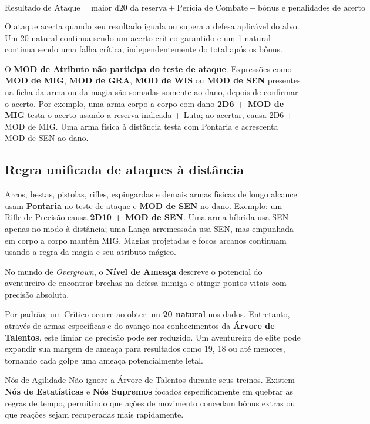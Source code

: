 \[\text{Resultado de Ataque}=\text{maior d20 da reserva}+\text{Perícia de Combate}+\text{bônus e penalidades de acerto}\]

O ataque acerta quando seu resultado iguala ou supera a defesa aplicável do alvo. Um 20 natural continua sendo um acerto crítico garantido e um 1 natural continua sendo uma falha crítica, independentemente do total após os bônus.

O \textbf{MOD de Atributo não participa do teste de ataque}. Expressões como \textbf{MOD de MIG}, \textbf{MOD de GRA}, \textbf{MOD de WIS} ou \textbf{MOD de SEN} presentes na ficha da arma ou da magia são somadas somente ao dano, depois de confirmar o acerto. Por exemplo, uma arma corpo a corpo com dano \textbf{2D6 + MOD de MIG} testa o acerto usando a reserva indicada + Luta; ao acertar, causa 2D6 + MOD de MIG. Uma arma física à distância testa com Pontaria e acrescenta MOD de SEN ao dano.

\subsection*{Regra unificada de ataques à distância}
Arcos, bestas, pistolas, rifles, espingardas e demais armas físicas de longo alcance usam \textbf{Pontaria} no teste de ataque e \textbf{MOD de SEN} no dano. Exemplo: um Rifle de Precisão causa \textbf{2D10 + MOD de SEN}. Uma arma híbrida usa SEN apenas no modo à distância; uma Lança arremessada usa SEN, mas empunhada em corpo a corpo mantém MIG. Magias projetadas e focos arcanos continuam usando a regra da magia e seu atributo mágico.

No mundo de \textit{Overgrown}, o \textbf{Nível de Ameaça} descreve o potencial do aventureiro de encontrar brechas na defesa inimiga e atingir pontos vitais com precisão absoluta.

Por padrão, um Crítico ocorre ao obter um \textbf{20 natural} nos dados. Entretanto, através de armas específicas e do avanço nos conhecimentos da \textbf{Árvore de Talentos}, este limiar de precisão pode ser reduzido. Um aventureiro de elite pode expandir sua margem de ameaça para resultados como 19, 18 ou até menores, tornando cada golpe uma ameaça potencialmente letal.

\begin{rpgboxtips}{Nós de Agilidade}
Não ignore a Árvore de Talentos durante seus treinos. Existem \textbf{Nós de Estatísticas} e \textbf{Nós Supremos} focados especificamente em quebrar as regras de tempo, permitindo que ações de movimento concedam bônus extras ou que reações sejam recuperadas mais rapidamente.
\end{rpgboxtips}

